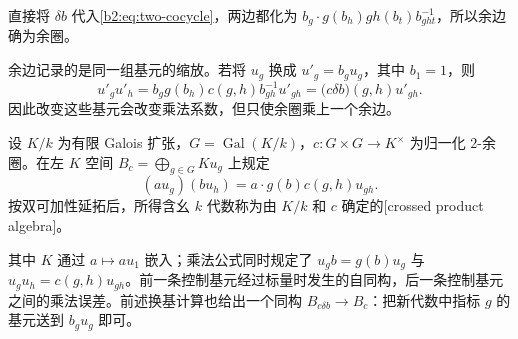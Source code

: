 直接将 \(\delta b\) 代入\eqref{b2:eq:two-cocycle}，两边都化为 \(b_g\cdot g(b_h)gh(b_t)b_{ght}^{-1}\)，所以余边确为余圈。

\ProseParagraphBreak
余边记录的是同一组基元的缩放。若将 \(u_g\) 换成 \(u'_g=b_g u_g\)，其中 \(b_1=1\)，则
\[
	u'_g u'_h =b_g g(b_h)c(g,h)b_{gh}^{-1}u'_{gh} =\bigl(c\delta b\bigr)(g,h)u'_{gh}.
\]
因此改变这些基元会改变乘法系数，但只使余圈乘上一个余边。

\begin{definition}\label{b2:def:galois-crossed-product}
	设 \(K/k\) 为有限 Galois 扩张，\(G=\operatorname{Gal}(K/k)\)，\(c:G\times G\rightarrow K^\times\) 为归一化 \(2\)-余圈。在左 \(K\) 空间 \(B_c=\bigoplus_{g\in G}Ku_g\) 上规定
	\begin{equation}\label{b2:eq:crossed-product-multiplication}
		(a u_g)(b u_h)=a\cdot g(b)c(g,h)u_{gh}.
	\end{equation}
	按双可加性延拓后，所得含幺 \(k\) 代数称为由 \(K/k\) 和 \(c\) 确定的[crossed product algebra]。
\end{definition}

其中 \(K\) 通过 \(a\mapsto au_1\) 嵌入；乘法公式同时规定了 \(u_g b=g(b)u_g\) 与 \(u_g u_h=c(g,h)u_{gh}\)。前一条控制基元经过标量时发生的自同构，后一条控制基元之间的乘法误差。前述换基计算也给出一个同构 \(B_{c\delta b}\to B_c\)：把新代数中指标 \(g\) 的基元送到 \(b_g u_g\) 即可。


